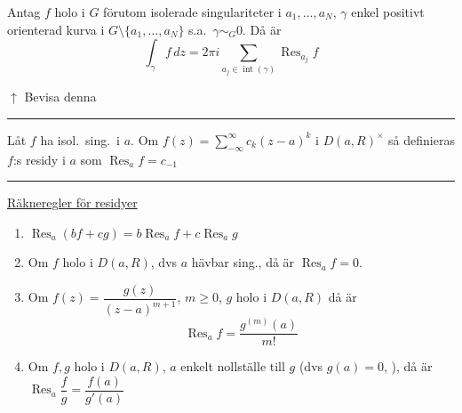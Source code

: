 \begin{theorem}[Residysatsen]
Antag $f$ holo i $G$ förutom isolerade singulariteter i $a_1, \dots, a_N$, $\gamma$ enkel positivt orienterad kurva i $G \setminus \{a_1, \dots, a_N\}$ s.a.\ $\gamma \sim_G 0$. Då är
\[ \int_\gamma f\,dz = 2\pi i\sum_{a_j \in \operatorname{int}(\gamma)} \operatorname{Res}_{a_j} f \]
\end{theorem}
\textcolor{magenta!80!black}{$\uparrow$ Bevisa denna}

\noindent\rule{\linewidth}{0.4pt}

\begin{definition}
Låt $f$ ha isol.\ sing.\ i $a$.
Om $f(z) = \sum_{-\infty}^\infty c_k(z - a)^k$ i $D(a, R)^\times$ så definieras $f$:s residy i $a$ som $\operatorname{Res}_a f = c_{-1}$
\end{definition}

\noindent\rule{\linewidth}{0.4pt}

\underline{Räkneregler för residyer}
\begin{enumerate}[label=\alph*)]
  \item $\operatorname{Res}_a(bf + cg) = b\operatorname{Res}_a f + c\operatorname{Res}_a g$
  \item Om $f$ holo i $D(a, R)$, dvs $a$ hävbar sing., då är $\operatorname{Res}_a f = 0$.
  \item Om $f(z) = \dfrac{g(z)}{(z - a)^{m + 1}}$, $m \ge 0$, $g$ holo i $D(a, R)$ då är
  \[ \operatorname{Res}_a f = \frac{g^{(m)}(a)}{m!} \]
  \item Om $f, g$ holo i $D(a, R)$, $a$ enkelt nollställe till $g$ (dvs $g(a) = 0$, ), då är $\operatorname{Res}_a \dfrac{f}{g} = \dfrac{f(a)}{g'(a)}$
\end{enumerate}
